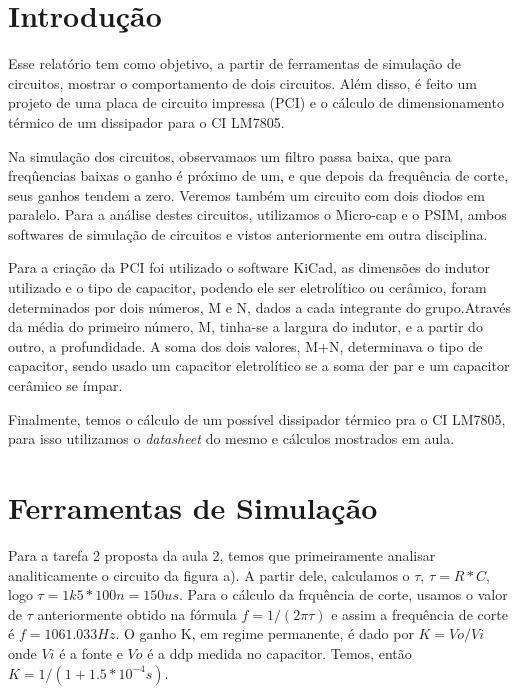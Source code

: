 \chapter*{Introdução}

Esse relatório tem como objetivo, a partir de ferramentas de simulação de circuitos, mostrar o comportamento de dois circuitos. Além disso, é feito um projeto de uma placa de circuito impressa (PCI) e o cálculo de dimensionamento térmico de um dissipador para o CI LM7805. 

Na simulação dos circuitos, observamaos um filtro passa baixa, que para freqûencias baixas o ganho é próximo de um, e que depois da frequência de corte, seus ganhos tendem a zero. Veremos também um circuito com dois diodos em paralelo. Para a análise destes circuitos, utilizamos o Micro-cap e o PSIM, ambos softwares de simulação de circuitos e vistos anteriormente em outra disciplina.

Para a criação da PCI foi utilizado o software KiCad, as dimensões do indutor utilizado e o tipo de capacitor, podendo ele ser eletrolítico ou cerâmico, foram determinados por dois números, M e N, dados a cada integrante do grupo.Através da média do primeiro número, M, tinha-se a largura do indutor, e a partir do outro, a profundidade. A soma dos dois valores, M+N, determinava o tipo de capacitor, sendo usado um capacitor eletrolítico se a soma der par e um capacitor cerâmico se ímpar.

Finalmente, temos o cálculo de um possível dissipador térmico pra o CI LM7805, para isso utilizamos o \textit{datasheet} do mesmo e cálculos mostrados em aula. 

\chapter{Ferramentas de Simulação}\label{cap_simul}
    Para a tarefa 2 proposta da aula 2, temos que primeiramente analisar analiticamente o circuito da figura a). A partir dele, calculamos o $\tau$, $\tau = R*C $, logo $\tau = 1k5 * 100n = 150us$. Para o cálculo da frquência de corte, usamos o valor de $\tau$ anteriormente obtido na fórmula $f = 1/(2\pi\tau)$ e assim a frequência de corte é $f = 1061.033 Hz$. O ganho K, em regime permanente, é dado por $K = Vo/Vi$ onde $Vi$ é a fonte e $Vo$ é a ddp medida no capacitor. Temos, então $K = 1/(1 + 1.5*10^{-4}s)$.
    
